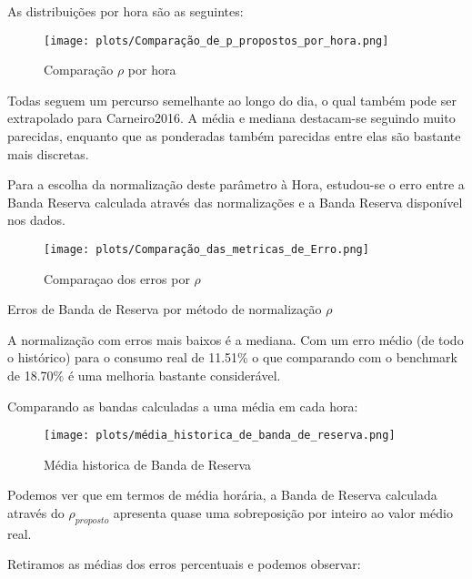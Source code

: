 As distribuições por hora são as seguintes:

\begin{figure}[H]
    \centering
    \texttt{[image: plots/Comparação\_de\_p\_propostos\_por\_hora.png]}
    \caption{Comparação $\rho$ por hora}
\end{figure}

Todas seguem um percurso semelhante ao longo do dia, o qual também pode ser extrapolado para Carneiro2016. A média e mediana destacam-se seguindo muito parecidas, enquanto que as ponderadas também parecidas entre elas são bastante mais discretas.\par
Para a escolha da normalização deste parâmetro à Hora, estudou-se o erro entre a Banda Reserva calculada através das normalizações e a Banda Reserva disponível nos dados.\par


\begin{figure}[H]
    \centering
    \texttt{[image: plots/Comparação\_das\_metricas\_de\_Erro.png]}
    \caption{Comparaçao dos erros por $\rho$}
\end{figure}


\begin{table}[H]
    \caption{Erros de Banda de Reserva por método de normalização $\rho$}    
    \resizebox{\linewidth}{!}{}
    \end{table}


A normalização com erros mais baixos é a mediana. Com um erro médio (de todo o histórico) para o consumo real de 11.51\% o que comparando com o benchmark de 18.70\% é uma melhoria  bastante considerável.\par
Comparando as bandas calculadas a uma média em cada hora: \\


\begin{figure}[H]
    \centering
    \texttt{[image: plots/média\_historica\_de\_banda\_de\_reserva.png]}
    \caption{Média historica de Banda de Reserva}
\end{figure}

Podemos ver que em termos de média horária, a Banda de Reserva calculada através do $\rho_{proposto}$ apresenta quase uma sobreposição por inteiro ao valor médio real.\par

Retiramos as médias dos erros percentuais e podemos observar: \\

